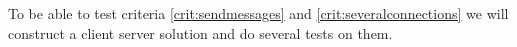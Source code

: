 To be able to test criteria \ref{crit:sendmessages} and \ref{crit:severalconnections} we will construct a client server solution and do several tests on them.






